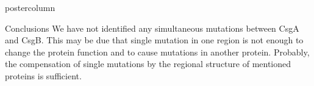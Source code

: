 \documentclass[final]{beamer}
\begin{document}
\begin{frame}
\begin{columns}
\begin{column}{.50\textwidth}
\begin{beamercolorbox}[center,wd=\textwidth]{postercolumn}
\begin{minipage}[T]{.95\textwidth}
{\begin{block}{Conclusions}
We have not identified any simultaneous mutations between CsgA and CsgB. This may be due that single mutation in one region is not enough to change the protein function and to cause mutations in another protein. Probably, the compensation of single mutations by the regional structure of mentioned proteins is sufficient.

\end{block}

  \vfill  
  
\vfill




}
\end{minipage}
\end{beamercolorbox}
\end{column}
\end{columns}  
\end{frame}
\end{document}
